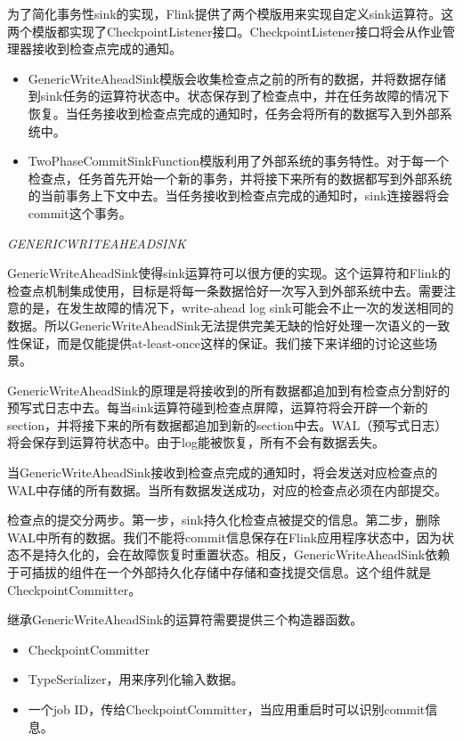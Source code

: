 \documentclass[cn,11pt,chinese]{elegantbook}
\begin{document}
为了简化事务性sink的实现，Flink提供了两个模版用来实现自定义sink运算符。这两个模版都实现了CheckpointListener接口。CheckpointListener接口将会从作业管理器接收到检查点完成的通知。

\begin{itemize}
    \item GenericWriteAheadSink模版会收集检查点之前的所有的数据，并将数据存储到sink任务的运算符状态中。状态保存到了检查点中，并在任务故障的情况下恢复。当任务接收到检查点完成的通知时，任务会将所有的数据写入到外部系统中。
    \item TwoPhaseCommitSinkFunction模版利用了外部系统的事务特性。对于每一个检查点，任务首先开始一个新的事务，并将接下来所有的数据都写到外部系统的当前事务上下文中去。当任务接收到检查点完成的通知时，sink连接器将会commit这个事务。
\end{itemize}

\textit{GENERICWRITEAHEADSINK}

GenericWriteAheadSink使得sink运算符可以很方便的实现。这个运算符和Flink的检查点机制集成使用，目标是将每一条数据恰好一次写入到外部系统中去。需要注意的是，在发生故障的情况下，write-ahead log sink可能会不止一次的发送相同的数据。所以GenericWriteAheadSink无法提供完美无缺的恰好处理一次语义的一致性保证，而是仅能提供at-least-once这样的保证。我们接下来详细的讨论这些场景。

GenericWriteAheadSink的原理是将接收到的所有数据都追加到有检查点分割好的预写式日志中去。每当sink运算符碰到检查点屏障，运算符将会开辟一个新的section，并将接下来的所有数据都追加到新的section中去。WAL（预写式日志）将会保存到运算符状态中。由于log能被恢复，所有不会有数据丢失。

当GenericWriteAheadSink接收到检查点完成的通知时，将会发送对应检查点的WAL中存储的所有数据。当所有数据发送成功，对应的检查点必须在内部提交。

检查点的提交分两步。第一步，sink持久化检查点被提交的信息。第二步，删除WAL中所有的数据。我们不能将commit信息保存在Flink应用程序状态中，因为状态不是持久化的，会在故障恢复时重置状态。相反，GenericWriteAheadSink依赖于可插拔的组件在一个外部持久化存储中存储和查找提交信息。这个组件就是CheckpointCommitter。

继承GenericWriteAheadSink的运算符需要提供三个构造器函数。

\begin{itemize}
    \item CheckpointCommitter
    \item TypeSerializer，用来序列化输入数据。
    \item 一个job ID，传给CheckpointCommitter，当应用重启时可以识别commit信息。
\end{itemize}
\end{document}
